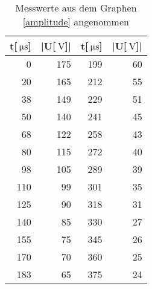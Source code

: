 \begin{table}[!h]
\begin{center}
\begin{tabular}{|r|r|r|r|}
\hline
t[$\SI{}{\micro\second}$] & |U[$\SI{}{\volt}$]| & t[$\SI{}{\micro\second}$] & |U[$\SI{}{\volt}$]| \\
\hline
\hline
0	&	175	& 199	&	60\\
20	&	165	& 212	&	55\\
38	&	149	& 229	&	51\\
50	&	140	& 241	&	45\\
68	&	122	& 258	&	43\\
80	&	115	& 272	&	40\\
98	&	105	& 289	&	39\\
110 &	99	& 301	&	35\\
125 &	90	& 318	&	31\\
140 &	85	& 330	&	27\\
155 &	75	& 345	&	26\\
170 &	70	& 360	&	25\\
183 &	65	& 375	&	24\\
\hline
\end{tabular}
\caption[Messwerte zu a]{Messwerte aus dem Graphen \eqref{amplitude} angenommen}
\label{werte_a}
\end{center}
\end{table}